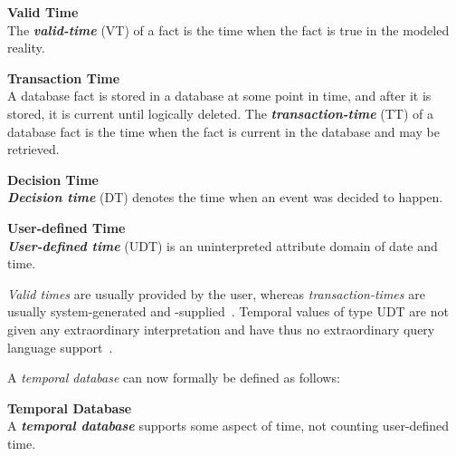 \begin{svgraybox}
\vspace{-10pt}
\begin{definition}\textbf{Valid Time}~\cite{Dyreson1994}\\
The \emph{\textbf{valid-time}} (VT) of a fact is the time when the fact is true in the modeled reality.
\end{definition}

\begin{definition}\textbf{Transaction Time}~\cite{Dyreson1994}\\
A database fact is stored in a database at some point in time, and after it is stored, it is current until logically deleted. The \emph{\textbf{transaction-time}} (TT) of a database fact is the time when the fact is current in the database and may be retrieved.
\end{definition}

\begin{definition}\textbf{Decision Time}~\cite{Nascimento95decisiontime}\\
\emph{\textbf{Decision time}} (DT) denotes the time when an event was decided to happen.
\end{definition}

\begin{definition}\textbf{User-defined Time}~\cite{Dyreson1994}\\
\emph{\textbf{User-defined time}} (UDT) is an uninterpreted attribute domain of date and time.
\end{definition}
\vspace{-10pt}
\end{svgraybox}

\emph{Valid times} are usually provided by the user, whereas \emph{transaction-times} are usually system-generated and -supplied~\cite{Dyreson1994}. Temporal values of type UDT are not given any extraordinary interpretation and have thus no extraordinary query language support~\cite{Dyreson1994}.

A \emph{temporal database} can now formally be defined as follows:

\begin{svgraybox}
\vspace{-10pt}
\begin{definition}\textbf{Temporal Database}~\cite{Dyreson1994}\\
A \emph{\textbf{temporal database}} supports some aspect of time, not counting user-defined time.
\end{definition}
\vspace{-10pt}
\end{svgraybox}

